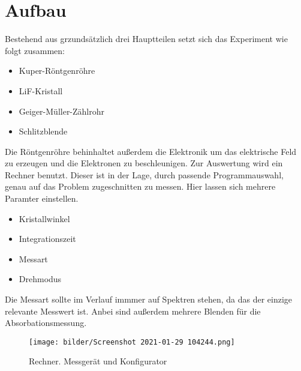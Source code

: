 \section{Aufbau}
Bestehend aus grzundsätzlich drei Hauptteilen setzt sich das Experiment wie folgt zusammen:
\begin{itemize}
    \item{Kuper-Röntgenröhre}
     \item{LiF-Kristall}
     \item{Geiger-Müller-Zählrohr}
     \item{Schlitzblende}
\end{itemize}
Die Röntgenröhre behinhaltet außerdem die Elektronik um das elektrische Feld zu erzeugen und die Elektronen zu beschleunigen.
Zur Auswertung wird ein Rechner benutzt. Dieser ist in der Lage, durch passende Programmauswahl, genau auf das Problem zugeschnitten zu messen. 
Hier lassen sich mehrere Paramter einstellen. 
\begin{itemize}
     \item{Kristallwinkel}
     \item{Integrationszeit}
     \item{Messart}
     \item{Drehmodus}
\end{itemize}
Die Messart sollte im Verlauf immmer auf Spektren stehen, da das der einzige relevante Messwert ist. Anbei sind außerdem mehrere Blenden für die Absorbationsmessung.

\begin{figure}
    \centering
    \texttt{[image: bilder/Screenshot 2021-01-29 104244.png]}
    \caption{Rechner. Messgerät und Konfigurator } %
    \label{fig:Rechner}
\end{figure}